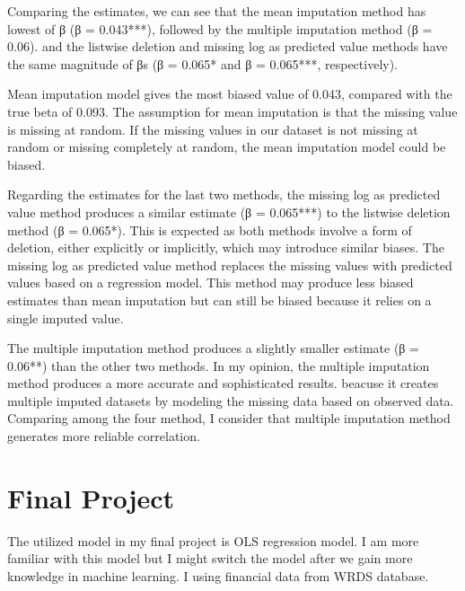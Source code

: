 \documentclass{article}
\begin{document}
Comparing the estimates, we can see that the mean imputation method has lowest of β (β = 0.043***), followed by the multiple imputation method (β = 0.06). and the listwise deletion and missing log as predicted value methods have the same magnitude of βs (β = 0.065* and β = 0.065***, respectively).


Mean imputation model gives the most biased value of 0.043, compared with the true beta of 0.093. The assumption for mean imputation is that the missing value is missing at random. If the missing values in our dataset is not missing at random or missing completely at random, the mean imputation model could be biased.

Regarding the estimates for the last two methods, the missing log as predicted value method produces a similar estimate (β = 0.065***) to the listwise deletion method (β = 0.065*). This is expected as both methods involve a form of deletion, either explicitly or implicitly, which may introduce similar biases. The missing log as predicted value method replaces the missing values with predicted values based on a regression model. This method may produce less biased estimates than mean imputation but can still be biased because it relies on a single imputed value.

The multiple imputation method produces a slightly smaller estimate (β = 0.06**) than the other two methods. In my opinion, the multiple imputation method produces a more accurate and sophisticated results. beacuse it creates multiple imputed datasets by modeling the missing data based on observed data. Comparing among the four method, I consider that multiple imputation method generates more reliable correlation.


\section{Final Project}
The utilized model in my final project is OLS regression model. I am more familiar with this model but I might switch the model after we gain more knowledge in machine learning. I using financial data from WRDS database.
\end{document}
